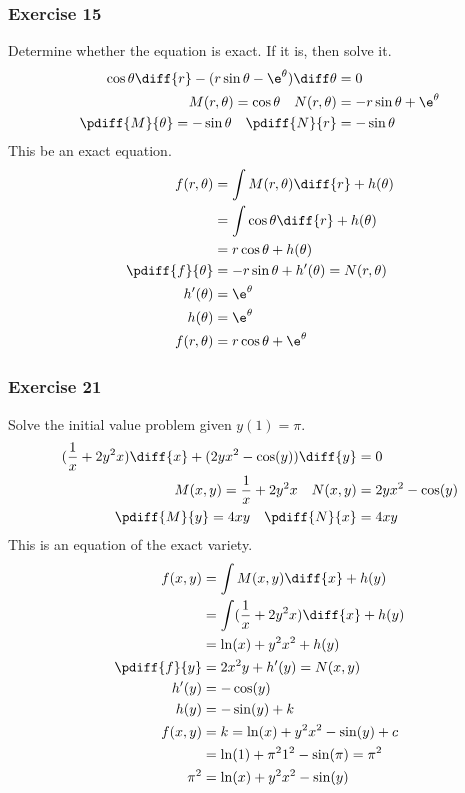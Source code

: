 \documentclass{math}
\begin{document}
\subsubsection*{Exercise 15}
Determine whether the equation is exact. If it is, then solve it.
\begin{align*}
  \cos\theta\diff{r}-(r\sin\theta-\e^\theta)\diff\theta &= 0 \\
  M(r,\theta) = \cos\theta \quad N(r,\theta) &= -r\sin\theta+\e^\theta \\
  \pdiff{M}{\theta} = -\sin\theta \quad \pdiff{N}{r} &= -\sin\theta \\
\end{align*}
This be an exact equation.
\begin{align*}
  f(r,\theta) &= \int M(r,\theta)\diff{r}+h(\theta) \\
  &= \int\cos\theta\diff{r}+h(\theta) \\
  &= r\cos\theta+h(\theta) \\
  \pdiff{f}{\theta} &= -r\sin\theta+h'(\theta) = N(r,\theta) \\
  h'(\theta) &= \e^\theta \\
  h(\theta) &= \e^\theta \\
  f(r,\theta) &= r\cos\theta+\e^\theta
\end{align*}

\subsubsection*{Exercise 21}
Solve the initial value problem given \( y(1) = \pi \).
\begin{align*}
  (\frac{1}{x}+2y^2x)\diff{x}+(2yx^2-\cos(y))\diff{y} &= 0 \\
  M(x,y) = \frac{1}{x}+2y^2x \quad N(x,y) &= 2yx^2-\cos(y) \\
  \pdiff{M}{y} = 4xy \quad \pdiff{N}{x} &= 4xy
\end{align*}
This is an equation of the exact variety.
\begin{align*}
  f(x,y) &= \int M(x,y)\diff{x}+h(y) \\
  &= \int(\frac{1}{x}+2y^2x)\diff{x}+h(y) \\
  &= \ln(x)+y^2x^2+h(y) \\
  \pdiff{f}{y} &= 2x^2y+h'(y) = N(x,y) \\
  h'(y) &= -\cos(y) \\
  h(y) &= -\sin(y)+k \\
  f(x,y) &= k = \ln(x)+y^2x^2-\sin(y)+c \\
  &= \ln(1)+\pi^21^2-\sin(\pi) = \pi^2 \\
  \pi^2 &= \ln(x)+y^2x^2-\sin(y)
\end{align*}
\end{document}
